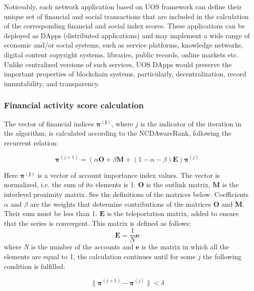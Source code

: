\documentclass[a4paper,12pt]{article}
\begin{document}
Noticeably, each network application based on U{\degree}OS framework can define their unique set of financial and social transactions that are included in the calculation of the corresponding financial and social index scores. These applications can be deployed as DApps (distributed applications) and may implement a wide range of economic and/or social systems, such as service platforms, knowledge networks, digital content copyright systems, libraries, public records, online markets etc. Unlike centralized versions of such services, U{\degree}OS DApps would preserve the important properties of blockchain systems, particularly, decentralization, record immutability, and transparency.






\subsubsection{Financial activity score calculation}
The vector of financial indices $\boldsymbol{\pi^{(j)}}$, where $j$ is the indicator of the iteration in the algorithm, is calculated according to the NCDAwareRank, following the recurrent relation: 

\begin{equation}
	    \label{recurrent_formula_for_ncdawarerank}
	    \boldsymbol{\pi}^{(j+1)} = ( \alpha \boldsymbol{O} + \beta \boldsymbol{M} + ( 1 - \alpha - \beta ) \boldsymbol{E} ) \boldsymbol{\pi}^{(j)}
	\end{equation}

Here $\boldsymbol{\pi^{(j)}}$ is a vector of account importance index values. The vector is normalized, i.e. the sum of its elements is 1. $\boldsymbol{O}$ is the outlink matrix, $\boldsymbol{M}$ is the interlevel proximity matrix. See the definitions of the matrices below. Coefficients $\alpha$ and $\beta$ are the weights that determine contributions of the matrices $\boldsymbol{O}$ and $\boldsymbol{M}$. Their sum must be less than 1. $\boldsymbol{E}$ is the teleportation matrix, added to ensure that the series is convergent. This matrix is defined as follows:
$$
\boldsymbol{E}=\frac{1}{N}\boldsymbol{e}
$$
where \textit{N} is the number of the accounts and $\boldsymbol{e}$ is the matrix in which all the elements are equal to 1, the calculation continues until for some $j$ the following condition is fulfilled: 



$$
\lVert \boldsymbol{\pi}^{(j+1)}-\boldsymbol{\pi}^{(j)} \rVert <\delta
$$
\end{document}
